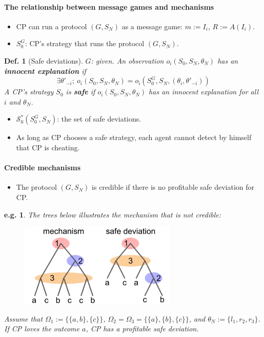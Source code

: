 \documentclass[11pt,a4paper,dvipdfmx]{article}
\theoremstyle{plain}
\newtheorem{df}{Def.}[section]
\newtheorem{eg}{e.g.}[section]
\newcommand{\mS}{\mathcal{S}}
\newcommand{\1}{\mathbbm{1}}
\begin{document}
\paragraph{The relationship between message games and mechanisms}
\begin{itemize}
	\item CP can run a protocol $(G, S_N)$ as a message game: $m := I_i$, $R := A(I_i)$.
	\item $S_0^G$: CP's strategy that runs the protocol $(G, S_N)$.
\end{itemize}
\begin{screen}
\begin{df}[Safe deviations] $G$: given.
	An observation $o_i(S_0, S_N, \theta_N)$ has an \textbf{innocent explanation} if
	\[
	\exists \theta'_{-i}; \ o_i(S_0, S_N, \theta_N) = o_i(S_0^G, S_N, (\theta_i, \theta'_{-i}))
	\]
	A CP's strategy $S_0$ is \textbf{safe} if $o_i(S_0, S_N, \theta_N)$ has an innocent explanation for all $i$ and $\theta_N$.
\end{df}
\end{screen}

\begin{itemize}
	\item $\mS_0^*(S_0^G, S_N)$: the set of safe deviations.
	\item As long as CP chooses a safe strategy, each agent cannot detect by himself that CP is cheating.
\end{itemize}

\paragraph{Credible mechanisms}
\begin{itemize}
	\item The protocol $(G, S_N)$ is credible if there is no profitable safe deviation for CP.
\end{itemize}
\begin{eg}
The trees below illustrates the mechanism that is not credible:
\begin{figure}[H]
  \centering
    \includegraphics[height=4cm]{image/credible.png}
    \label{fig1}
\end{figure}
Assume that $\Omega_1 := \{\{a,b\}, \{c\}\}$, $\Omega_2 = \Omega_3 = \{\{a\}, \{b\}, \{c\}\}$, and $\theta_N := \{l_1, r_2, r_3\}$. 
If CP loves the outcome $a$, CP has a profitable safe deviation.
\end{eg}
\end{document}
